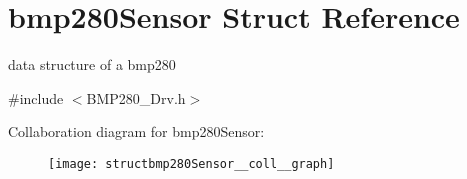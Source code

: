 \hypertarget{structbmp280Sensor}{}\section{bmp280\+Sensor Struct Reference}
\label{structbmp280Sensor}


data structure of a bmp280  




{\ttfamily \#include $<$B\+M\+P280\+\_\+\+Drv.\+h$>$}



Collaboration diagram for bmp280\+Sensor\+:\nopagebreak
\begin{figure}[H]
\begin{center}
\leavevmode
\texttt{[image: structbmp280Sensor\_\_coll\_\_graph]}
\end{center}
\end{figure}
